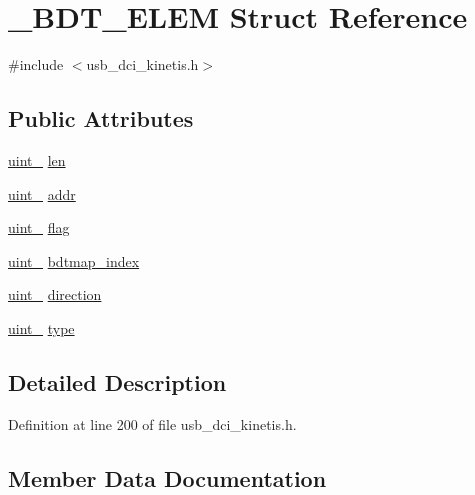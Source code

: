 \hypertarget{struct___b_d_t___e_l_e_m}{}\section{\+\_\+\+B\+D\+T\+\_\+\+E\+L\+EM Struct Reference}
\label{struct___b_d_t___e_l_e_m}


{\ttfamily \#include $<$usb\+\_\+dci\+\_\+kinetis.\+h$>$}

\subsection*{Public Attributes}
\begin{DoxyCompactItemize}
\item 
\hyperlink{types_8h_a8ab774e38493b7c7e4d8edfd5004e66b}{uint\+\_} \hyperlink{struct___b_d_t___e_l_e_m_a87471c8e8ecbecc4fec59fd72ad6ef37}{len}
\item 
\hyperlink{types_8h_a5532400b872b4aa84e54335bf458a318}{uint\+\_} \hyperlink{struct___b_d_t___e_l_e_m_a8fa5903b3f848e9e7eef0ea85b9aa5ef}{addr}
\item 
\hyperlink{types_8h_ad3209046c23f739a81581c10a4be7d92}{uint\+\_} \hyperlink{struct___b_d_t___e_l_e_m_a8077093bb9ba956164061b60a3c58285}{flag}
\item 
\hyperlink{types_8h_ad3209046c23f739a81581c10a4be7d92}{uint\+\_} \hyperlink{struct___b_d_t___e_l_e_m_a7418a40bce7c69452bd45f76c3eeffec}{bdtmap\+\_\+index}
\item 
\hyperlink{types_8h_ad3209046c23f739a81581c10a4be7d92}{uint\+\_} \hyperlink{struct___b_d_t___e_l_e_m_ad5d6f0b23ab5c9c48b33ccfb2edd536f}{direction}
\item 
\hyperlink{types_8h_ad3209046c23f739a81581c10a4be7d92}{uint\+\_} \hyperlink{struct___b_d_t___e_l_e_m_a2b6afaa8500c6c5f578d00605bd0b8bc}{type}
\end{DoxyCompactItemize}


\subsection{Detailed Description}


Definition at line 200 of file usb\+\_\+dci\+\_\+kinetis.\+h.



\subsection{Member Data Documentation}
